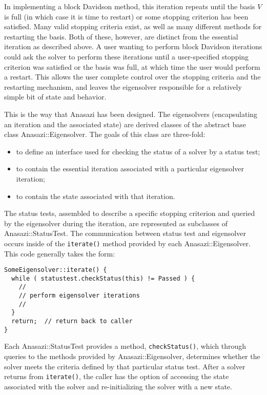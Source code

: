 In implementing a block Davidson method, this iteration repeats until the basis $V$ is full
(in which case it is time to restart) or some stopping criterion has been satisfied. Many
valid stopping criteria exist, as well as many different methods for restarting the basis.
Both of these, however, are distinct from the essential iteration as described above. A
user wanting to perform block Davidson iterations could ask the solver to perform these
iterations until a user-specified stopping criterion was satisfied or the basis was full,
at which time the user would perform a restart. This allows the user complete control over
the stopping criteria and the restarting mechanism, and leaves the eigensolver responsible
for a relatively simple bit of state and behavior.

This is the way that Anasazi has been designed. The eigensolvers (encapsulating an
iteration and the associated state) are derived classes of the abstract base class
Anasazi::Eigensolver. The goals of this class are three-fold:
\begin{itemize}
  \item to define an interface used for checking the status of a solver by a status test;
  \item to contain the essential iteration associated with a particular eigensolver iteration;
  \item to contain the state associated with that iteration.
\end{itemize}

The status tests, assembled to describe a specific stopping criterion and queried by the eigensolver
during the iteration, are represented as subclasses of Anasazi::StatusTest. The
communication between status test and eigensolver occurs
inside of the \verb!iterate()! method provided by each Anasazi::Eigensolver. This code
generally takes the form:
\begin{verbatim}
SomeEigensolver::iterate() {
  while ( statustest.checkStatus(this) != Passed ) {
    //
    // perform eigensolver iterations
    //
  }
  return;  // return back to caller
}
\end{verbatim}

Each Anasazi::StatusTest provides a method, \verb!checkStatus()!, which through queries to
the methods provided by Anasazi::Eigensolver, determines whether the solver meets the
criteria defined by that particular status test. After a solver returns from
\verb!iterate()!, the caller has the option of accessing the state associated with the
solver and re-initializing the solver with a new state.

